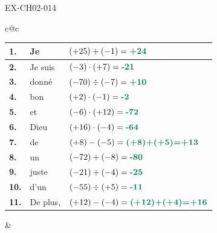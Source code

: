 \documentclass[12pt, a4paper]{article}
\begin{document}
\begin{solution}{EX-CH02-014}

\renewcommand{\arraystretch}{1.7}
\setlength{\tabcolsep}{4pt}
\vspace{2mm}

\begin{center}
\begin{tabular}{c@{\hspace{8mm}}c}

  \begin{tabular}{|>{\centering\arraybackslash}p{6mm}|p{2.5cm}|p{4.0cm}|}
    \hline
    \cellcolor{gray!40}\textbf{1.}  &Je& $(+25)+(-1)=\rc{+24}$               \\ \hline
    \cellcolor{gray!40}\textbf{2.}  &Je suis& $(-3)\cdot(+7)=\rc{-21}$              \\ \hline
    \cellcolor{gray!40}\textbf{3.}  &donné& $(-70)\div(-7)=\rc{+10}$              \\ \hline
    \cellcolor{gray!40}\textbf{4.}  &bon& $(+2)\cdot(-1)=\rc{-2}$               \\ \hline
    \cellcolor{gray!40}\textbf{5.}  &et& $(-6)\cdot(+12)=\rc{-72}$             \\ \hline
    \cellcolor{gray!40}\textbf{6.}  &Dieu& $(+16)\cdot(-4)=\rc{-64}$             \\ \hline
    \cellcolor{gray!40}\textbf{7.}  &de& $(+8)-(-5)=\rc{(+8)+(+5)=+13}$        \\ \hline
    \cellcolor{gray!40}\textbf{8.}  &un& $(-72)+(-8)=\rc{-80}$                 \\ \hline
    \cellcolor{gray!40}\textbf{9.}  &juste& $(-21)+(-4)=\rc{-25}$                 \\ \hline
    \cellcolor{gray!40}\textbf{10.} &d'un& $(-55)\div(+5)=\rc{-11}$              \\ \hline
    \cellcolor{gray!40}\textbf{11.} &De plus,& $(+12)-(-4)=\rc{(+12)+(+4)=+16}$      \\ \hline
  \end{tabular}

  &


\end{tabular}
\end{center}
\end{solution}
\end{document}
